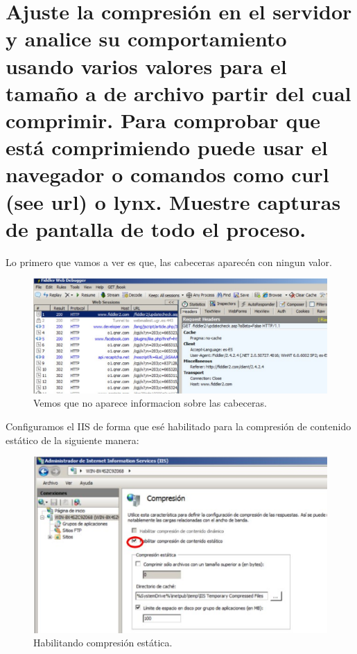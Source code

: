 \section{Ajuste la compresión en el servidor y analice su comportamiento usando varios valores para el tamaño a de archivo partir del cual comprimir. Para comprobar que está comprimiendo puede usar el navegador o comandos como curl (see url) o lynx. Muestre capturas de pantalla de todo el proceso.}

Lo primero que vamos a ver es que, las cabeceras aparecén con ningun valor.

\begin{figure}[H]
\begin{center}
\includegraphics[scale=0.4]{imagenes/cuestion7-1.eps}
\caption{Vemos que no aparece informacion sobre las cabeceras.}
\end{center}
\end{figure}

Configuramos el IIS de forma que esé habilitado para la compresión de contenido estático de la siguiente manera:
\begin{figure}[H]
\begin{center}
\includegraphics[scale=0.5]{imagenes/cuestion7-2.eps}
\caption{Habilitando compresión estática.}
\end{center}
\end{figure}

